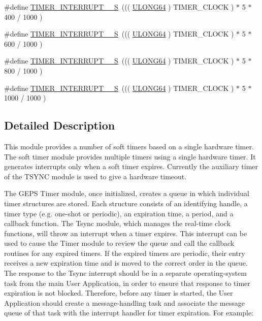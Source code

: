 \begin{DoxyCompactItemize}
\item 
\#define \hyperlink{a00673_gabe6b8cc50a953b9686cec098e74ab340}{TIMER\_\-INTERRUPT\_\_\-S}~((( \hyperlink{a00660_ga28961430434ccabca6862ea93fe9a15b}{ULONG64} ) TIMER\_\-CLOCK ) $\ast$ 5 $\ast$ 400 / 1000 )
\item 
\#define \hyperlink{a00673_gaf80325273d8e20207f0914fd0c8b89ec}{TIMER\_\-INTERRUPT\_\_\-S}~((( \hyperlink{a00660_ga28961430434ccabca6862ea93fe9a15b}{ULONG64} ) TIMER\_\-CLOCK ) $\ast$ 5 $\ast$ 600 / 1000 )
\item 
\#define \hyperlink{a00673_gaab56eb2c0a9908dff18f586c3b83c0e9}{TIMER\_\-INTERRUPT\_\_\-S}~((( \hyperlink{a00660_ga28961430434ccabca6862ea93fe9a15b}{ULONG64} ) TIMER\_\-CLOCK ) $\ast$ 5 $\ast$ 800 / 1000 )
\item 
\#define \hyperlink{a00673_ga0e66fa016e02f9158c8c7ed5ca54c11d}{TIMER\_\-INTERRUPT\_\_\-S}~((( \hyperlink{a00660_ga28961430434ccabca6862ea93fe9a15b}{ULONG64} ) TIMER\_\-CLOCK ) $\ast$ 5 $\ast$ 1000 / 1000 )
\end{DoxyCompactItemize}


\subsection{Detailed Description}
This module provides a number of soft timers based on a single hardware timer. The soft timer module provides multiple timers using a single hardware timer. It generates interrupts only when a soft timer expires. Currently the auxiliary timer of the TSYNC module is used to give a hardware timeout.

The GEPS Timer module, once initialized, creates a queue in which individual timer structures are stored. Each structure consists of an identifying handle, a timer type (e.g. one-\/shot or periodic), an expiration time, a period, and a callback function. The Tsync module, which manages the real-\/time clock functions, will throw an interrupt when a timer expires. This interrupt can be used to cause the Timer module to review the queue and call the callback routines for any expired timers. If the expired timers are periodic, their entry receives a new expiration time and is moved to the correct order in the queue. The response to the Tsync interrupt should be in a separate operating-\/system task from the main User Application, in order to ensure that response to timer expiration is not blocked. Therefore, before any timer is started, the User Application should create a message-\/handling task and associate the message queue of that task with the interrupt handler for timer expiration. For example:

